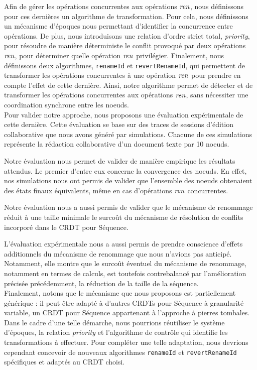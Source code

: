 Afin de gérer les opérations concurrentes aux opérations $\mathit{ren}$, nous définissons pour ces dernières un algorithme de transformation.
Pour cela, nous définissons un mécanisme d'époques nous permettant d'identifier la concurrence entre opérations.
De plus, nous introduisons une relation d'ordre strict total, \emph{priority}, pour résoudre de manière déterministe le conflit provoqué par deux opérations $\mathit{ren}$, \ie pour déterminer quelle opération $\mathit{ren}$ privilégier.
Finalement, nous définissons deux algorithmes, \texttt{renameId} et \texttt{revertRenameId}, qui permettent de transformer les opérations concurrentes à une opération $\mathit{ren}$ pour prendre en compte l'effet de cette dernière.
Ainsi, notre algorithme permet de détecter et de transformer les opérations concurrentes aux opérations $\mathit{ren}$, sans nécessiter une coordination synchrone entre les noeuds.\\


Pour valider notre approche, nous proposons une évaluation expérimentale de cette dernière.
Cette évaluation se base sur des traces de sessions d'édition collaborative que nous avons généré par simulations.
Chacune de ces simulations représente la rédaction collaborative d'un document texte par 10 noeuds.

Notre évaluation nous permet de valider de manière empirique les résultats attendus.
Le premier d'entre eux concerne la convergence des noeuds.
En effet, nos simulations nous ont permis de valider que l'ensemble des noeuds obtenaient des états finaux équivalents, même en cas d'opérations $\mathit{ren}$ concurrentes.

Notre évaluation nous a aussi permis de valider que le mécanisme de renommage réduit à une taille minimale le surcoût du mécanisme de résolution de conflits incorporé dans le \ac{CRDT} pour Séquence.

L'évaluation expérimentale nous a aussi permis de prendre conscience d'effets additionnels du mécanisme de renommage que nous n'avions pas anticipé.
Notamment, elle montre que le surcoût éventuel du mécanisme de renommage, notamment en termes de calculs, est toutefois contrebalancé par l'amélioration précisée précédemment, \ie la réduction de la taille de la séquence.\\

Finalement, notons que le mécanisme que nous proposons est partiellement générique : il peut être adapté à d'autres \acp{CRDT} pour Séquence à granularité variable, \eg un \ac{CRDT} pour Séquence appartenant à l'approche à pierres tombales.
Dans le cadre d'une telle démarche, nous pourrions réutiliser le système d'époques, la relation \emph{priority} et l'algorithme de contrôle qui identifie les transformations à effectuer.
Pour compléter une telle adaptation, nous devrions cependant concevoir de nouveaux algorithmes \texttt{renameId} et \texttt{revertRenameId} spécifiques et adaptés au \ac{CRDT} choisi.\\

